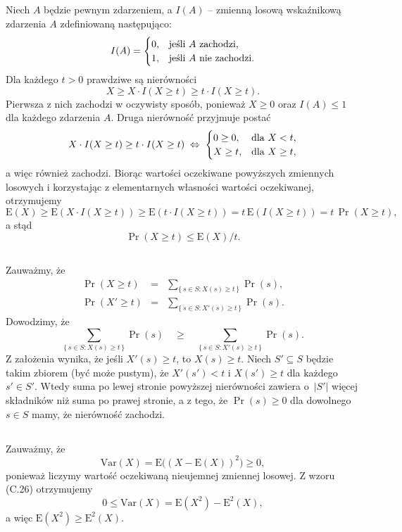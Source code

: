 \subsection{} %
Niech $A$ będzie pewnym zdarzeniem, a $I(A)$ -- zmienną losową wskaźnikową zdarzenia $A$ zdefiniowaną następująco:
\[
	I(A) =
	\begin{cases}
		0, & \hbox{jeśli }A\hbox{ zachodzi,} \\
		1, & \hbox{jeśli }A\hbox{ nie zachodzi.}
	\end{cases}
\]
Dla każdego $t>0$ prawdziwe są nierówności
\[
	X\ge X\cdot I(X\ge t)\ge t\cdot I(X\ge t).
\]
Pierwsza z nich zachodzi w oczywisty sposób, ponieważ $X\ge0$ oraz $I(A)\le1$ dla każdego zdarzenia $A$. Druga nierówność przyjmuje postać
\[
	X\cdot I(X\ge t)\ge t\cdot I(X\ge t)\;\Leftrightarrow\;
	\begin{cases}
		0\ge0, & \hbox{dla }X<t, \\
		X\ge t, & \hbox{dla }X\ge t,
	\end{cases}
\]
a więc również zachodzi. Biorąc wartości oczekiwane powyższych zmiennych losowych i korzystając z elementarnych własności wartości oczekiwanej, otrzymujemy
\[
	\mathrm{E}(X) \ge \mathrm{E}(X\cdot I(X\ge t)) \ge \mathrm{E}(t\cdot I(X\ge t)) = t\,\mathrm{E}(I(X\ge t)) = t\,\Pr(X\ge t),
\]
a stąd
\[
	\Pr(X\ge t) \le \mathrm{E}(X)/t.
\]

\subsection{} %
Zauważmy, że
\begin{eqnarray*}
	\Pr(X\ge t) &=& \sum_{\{\,s\in S:X(s)\ge t\,\}}\Pr(s), \\
	\Pr(X'\ge t) &=& \sum_{\{\,s\in S:X'(s)\ge t\,\}}\Pr(s).
\end{eqnarray*}
Dowodzimy, że
\[
	\sum_{\{\,s\in S:X(s)\ge t\,\}}\Pr(s)\quad \ge \quad\sum_{\{\,s\in S:X'(s)\ge t\,\}}\Pr(s).
\]
Z założenia wynika, że jeśli $X'(s)\ge t$, to $X(s)\ge t$. Niech $S'\subseteq S$ będzie takim zbiorem (być może pustym), że $X'(s')<t$ i $X(s')\ge t$ dla każdego $s'\in S'$. Wtedy suma po lewej stronie powyższej nierówności zawiera o~$|S'|$ więcej składników niż suma po prawej stronie, a z tego, że $\Pr(s)\ge0$ dla dowolnego $s\in S$ mamy, że nierówność zachodzi.

\subsection{} %
Zauważmy, że
\[
	\mathrm{Var}(X) = \mathrm{E}\bigl((X-\mathrm{E}(X))^2\bigr) \ge 0,
\]
ponieważ liczymy wartość oczekiwaną nieujemnej zmiennej losowej. Z wzoru (C.26) otrzymujemy
\[
	0 \le \mathrm{Var}(X) = \mathrm{E}(X^2)-\mathrm{E}^2(X),
\]
a więc $\mathrm{E}(X^2)\ge\mathrm{E}^2(X)$.

